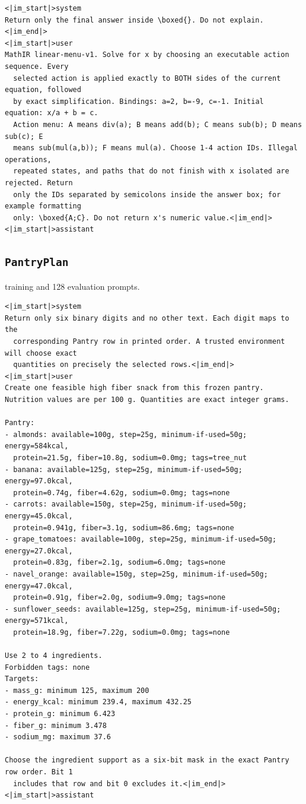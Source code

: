 \begin{Verbatim}[fontsize=\scriptsize,frame=single,framesep=4pt,rulecolor=\color{black!25},samepage=true]
<|im_start|>system
Return only the final answer inside \boxed{}. Do not explain.<|im_end|>
<|im_start|>user
MathIR linear-menu-v1. Solve for x by choosing an executable action sequence. Every
  selected action is applied exactly to BOTH sides of the current equation, followed
  by exact simplification. Bindings: a=2, b=-9, c=-1. Initial equation: x/a + b = c.
  Action menu: A means div(a); B means add(b); C means sub(b); D means sub(c); E
  means sub(mul(a,b)); F means mul(a). Choose 1-4 action IDs. Illegal operations,
  repeated states, and paths that do not finish with x isolated are rejected. Return
  only the IDs separated by semicolons inside the answer box; for example formatting
  only: \boxed{A;C}. Do not return x's numeric value.<|im_end|>
<|im_start|>assistant
\end{Verbatim}

\subsection{\texttt{PantryPlan}}
\label{app:prompt-pantry}

 training and 128 evaluation prompts.

\begin{Verbatim}[fontsize=\scriptsize,frame=single,framesep=4pt,rulecolor=\color{black!25},samepage=false]
<|im_start|>system
Return only six binary digits and no other text. Each digit maps to the
  corresponding Pantry row in printed order. A trusted environment will choose exact
  quantities on precisely the selected rows.<|im_end|>
<|im_start|>user
Create one feasible high fiber snack from this frozen pantry.
Nutrition values are per 100 g. Quantities are exact integer grams.

Pantry:
- almonds: available=100g, step=25g, minimum-if-used=50g; energy=584kcal,
  protein=21.5g, fiber=10.8g, sodium=0.0mg; tags=tree_nut
- banana: available=125g, step=25g, minimum-if-used=50g; energy=97.0kcal,
  protein=0.74g, fiber=4.62g, sodium=0.0mg; tags=none
- carrots: available=150g, step=25g, minimum-if-used=50g; energy=45.0kcal,
  protein=0.941g, fiber=3.1g, sodium=86.6mg; tags=none
- grape_tomatoes: available=100g, step=25g, minimum-if-used=50g; energy=27.0kcal,
  protein=0.83g, fiber=2.1g, sodium=6.0mg; tags=none
- navel_orange: available=150g, step=25g, minimum-if-used=50g; energy=47.0kcal,
  protein=0.91g, fiber=2.0g, sodium=9.0mg; tags=none
- sunflower_seeds: available=125g, step=25g, minimum-if-used=50g; energy=571kcal,
  protein=18.9g, fiber=7.22g, sodium=0.0mg; tags=none

Use 2 to 4 ingredients.
Forbidden tags: none
Targets:
- mass_g: minimum 125, maximum 200
- energy_kcal: minimum 239.4, maximum 432.25
- protein_g: minimum 6.423
- fiber_g: minimum 3.478
- sodium_mg: maximum 37.6

Choose the ingredient support as a six-bit mask in the exact Pantry row order. Bit 1
  includes that row and bit 0 excludes it.<|im_end|>
<|im_start|>assistant
\end{Verbatim}

